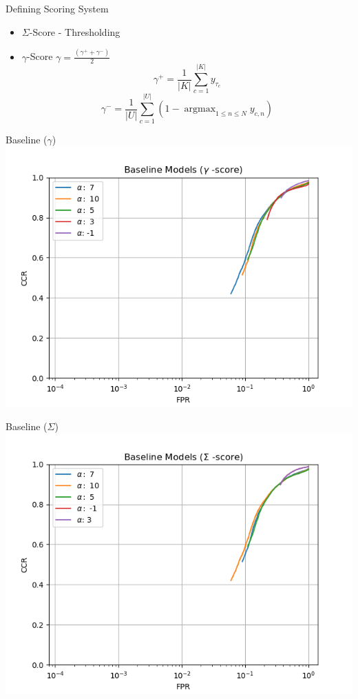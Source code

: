 \begin{frame}{Defining Scoring System}
	\begin{itemize}
		\item $\Sigma$-Score - Thresholding
		\item $\gamma$-Score $ \gamma = \frac{(\gamma^+ + \gamma^-)}{2}$
		      \begin{equation}
			      \gamma^+ = \frac{1}{|K|} \sum_{c=1}^{|K|} y_{\tau_c}
		      \end{equation}
		      \begin{equation}
			      \gamma^- = \frac{1}{|U|} \sum_{c=1}^{|U|} \left ( 1 - \operatorname{argmax}_{1 \leq n \leq N} y_{c,n} \right)
		      \end{equation}
	\end{itemize}
\end{frame}

\begin{frame}{Baseline ($\gamma$)}
	\includegraphics[width=\textwidth]{figures/base_gamma.png}
\end{frame}

\begin{frame}{Baseline ($\Sigma$)}
	\includegraphics[width=\textwidth]{figures/base_sigma.png}
\end{frame}

